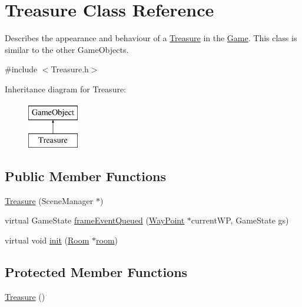 \hypertarget{classTreasure}{\section{\-Treasure \-Class \-Reference}
\label{classTreasure}
}


\-Describes the appearance and behaviour of a \hyperlink{classTreasure}{\-Treasure} in the \hyperlink{classGame}{\-Game}. \-This class is similar to the other \-Game\-Objects.  




{\ttfamily \#include $<$\-Treasure.\-h$>$}

\-Inheritance diagram for \-Treasure\-:\begin{figure}[H]
\begin{center}
\leavevmode
\includegraphics[height=2.000000cm]{classTreasure}
\end{center}
\end{figure}
\subsection*{\-Public \-Member \-Functions}
\begin{DoxyCompactItemize}
\item 
\hyperlink{classTreasure_a315282461bc05e7989fe6facbe6a1b43}{\-Treasure} (\-Scene\-Manager $\ast$)
\item 
virtual \-Game\-State \hyperlink{classTreasure_a31089b8e8c8478e7c3e950b80bdb3785}{frame\-Event\-Queued} (\hyperlink{classWayPoint}{\-Way\-Point} $\ast$current\-W\-P, \-Game\-State gs)
\item 
virtual void \hyperlink{classTreasure_a5fcd48652f78053fcb0c84e6a89415fe}{init} (\hyperlink{classRoom}{\-Room} $\ast$\hyperlink{classGameObject_a9f63419cc03f2513f757a317a2e37557}{room})
\end{DoxyCompactItemize}
\subsection*{\-Protected \-Member \-Functions}
\begin{DoxyCompactItemize}
\item 
\hyperlink{classTreasure_ac8a58fbc1d42bd355d9fdb2b5b8ba5e2}{\-Treasure} ()
\end{DoxyCompactItemize}
